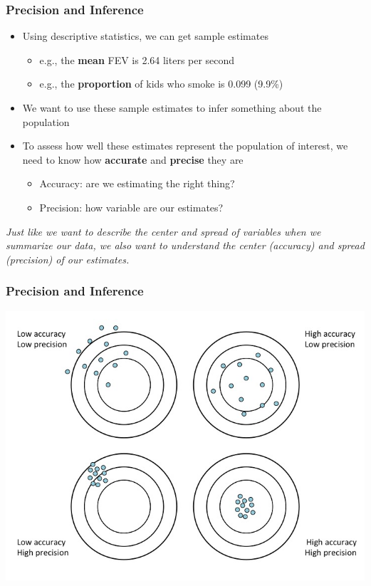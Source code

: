 \documentclass[12pt, 
hyperref={colorlinks=true, linkcolor=blue, urlcolor=cyan}]{beamer}
\begin{document}
\begin{frame}
\frametitle{Precision and Inference}
\begin{itemize}
\item Using descriptive statistics, we can get sample estimates
	\begin{itemize}
	\item e.g., the \textbf{mean} FEV is 2.64 liters per second
	\item e.g., the \textbf{proportion} of kids who smoke is 0.099 (9.9\%)
	\end{itemize}
\pause
\item We want to use these sample estimates to infer something about the population
\pause
\item To assess how well these estimates represent the population of interest, we need to know how \textbf{accurate} and \textbf{precise} they are
	\begin{itemize}
	\item Accuracy: are we estimating the right thing? %
	\item Precision: how variable are our estimates? 
	\end{itemize}
\end{itemize}
\vspace{-0.3cm} \textit{Just like we want to describe the center and spread of variables when we summarize our data, we also want to understand the center (accuracy) and spread (precision) of our estimates.}
\end{frame}

\begin{frame}
\frametitle{Precision and Inference}
\includegraphics[width=\textwidth]{./accuracy} %
\end{frame}
\end{document}
